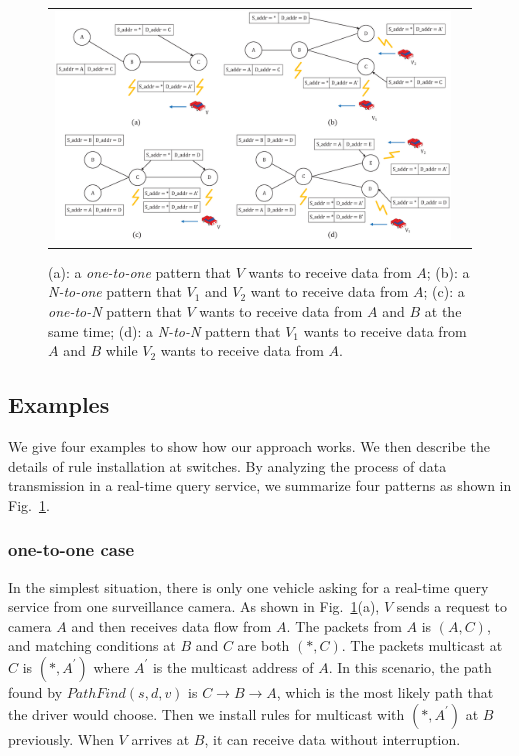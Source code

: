 \documentclass[journal]{IEEEtran}
\begin{document}
\begin{figure} [t]
\begin{center}
\begin{tabular}{cc}
\includegraphics[width=1.9\columnwidth]{fig8-big.eps}
\end{tabular}
\caption{(a): a \textit{one-to-one} pattern that $V$ wants to receive data from $A$; (b): a \textit{N-to-one} pattern that $V_{1}$ and $V_{2}$ want to receive data from $A$; (c): a \textit{one-to-N} pattern that $V$ wants to receive data from $A$ and $B$ at the same time; (d): a \textit{N-to-N} pattern that $V_{1}$ wants to receive data from $A$ and $B$ while $V_{2}$ wants to receive data from $A$.} \label{fig7}
  \end{center}
  \vspace{-0.3in}
\end{figure}


\subsection{Examples} \label{Examples}



We give four examples to show how our approach works. We then describe the details of rule installation at switches. By analyzing the process of data transmission in a real-time query service, we summarize four patterns as shown in Fig.~\ref{fig7}.

\subsubsection{one-to-one \rm{case}} \label{1 to 1}

In the simplest situation, there is only one vehicle asking for a real-time query service from one surveillance camera. As shown in Fig.~\ref{fig7}(a), $V$ sends a request to camera $A$ and then receives data flow from $A$. The packets from $A$ is $(A, C)$, and matching conditions at $B$ and $C$ are both $(*, C)$. The packets multicast at $C$ is $(*, A^{'})$ where $A^{'}$ is the multicast address of $A$. In this scenario, the path found by $PathFind(s,d,v)$ is $C\to B \to A$, which is the most likely path that the driver would choose. Then we install rules for multicast with $(*,A^{'})$ at $B$ previously. When $V$ arrives at $B$, it can receive data without interruption.
\end{document}
